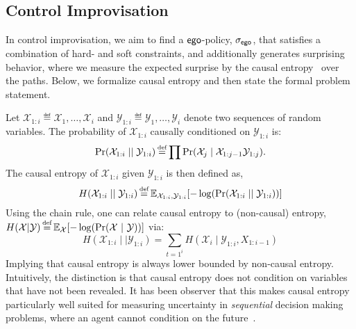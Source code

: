 {{{

\begin{example}
	
\end{example}

\subsection{Control Improvisation}
In control improvisation, we aim to find a $\mathsf{ego}$-policy,
${\sigma_{\mathsf{ego}}}$, that satisfies a combination of hard- and soft
constraints, and additionally generates surprising behavior, where we
measure the expected surprise by the causal
entropy~\cite{DirectedInfoTheoery} over the paths. Below, we formalize
causal entropy and then state the formal problem statement.

Let $\mathcal{X}_{1:i} \eqdef \mathcal{X}_1, \hdots, \mathcal{X}_i$ and $\mathcal{Y}_{1:i} \eqdef
\mathcal{Y}_1,\hdots,\mathcal{Y}_i$ denote two sequences of random variables. The
probability of $ \mathcal{X}_{1:i}$ causally conditioned on $\mathcal{Y}_{1:i}$ is:
\begin{equation}
  \causalprob{\mathcal{X}_{1:i}}{\mathcal{Y}_{1:i}} \eqdef \prod \Pr(\mathcal{X}_j \mid \mathcal{X}_{1:j-1}\mathcal{Y}_{1:j}).
\end{equation}
The causal entropy of $\mathcal{X}_{1:i}$ given $\mathcal{Y}_{1:i}$ is then defined as,
\begin{equation}
  H(\mathcal{X}_{1:i}\mid\mid \mathcal{Y}_{1:i}) \eqdef \expOver{\mathcal{X}_{1:i},\mathcal{Y}_{1:i}}{-\log(\causalprob{\mathcal{X}_{1:i}}{\mathcal{Y}_{1:i}})}
\end{equation}
Using the chain rule, one can relate causal entropy to (non-causal) entropy, $H(\mathcal{X} | \mathcal{Y}) \eqdef \expOver{\mathcal{X}}{-\log(\Pr(\mathcal{X}~|~\mathcal{Y}))}$ via:
\begin{equation}
  H(\mathcal{X}_{1:i}\mid\mid \mathcal{Y}_{1:i}) = \sum_{t=1^i} H(\mathcal{X}_i \mid \mathcal{Y}_{1:i}, X_{1:i-1})
\end{equation}
Implying that causal entropy is always lower bounded by non-causal
entropy. Intuitively, the distinction is that causal entropy does not
condition on variables that have not been revealed. It has been observer
that this makes causal entropy particularly well suited for measuring
uncertainty in \emph{sequential} decision making problems, where
an agent cannot condition on the future~\cite{mceThesis}.

}}}
